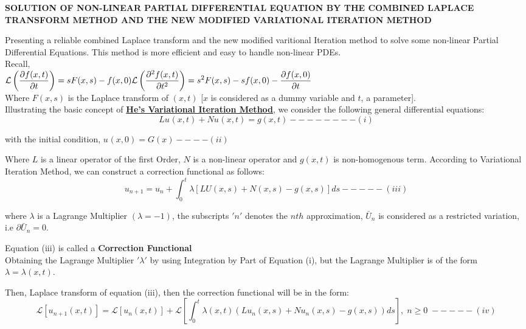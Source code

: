 \documentclass[a4paper 11pt]{article}
\newcommand{\Laplace}{\mathcal{L}}
\newcommand{\Un}[2]{u_{#1}(#2)}
\newcommand{\NI}{\noindent}
\newcommand{\LT}[1]{\Laplace \left[#1\right]}
\newcommand{\LTb}[1]{\Laplace \left(#1\right)}
\begin{document}
\newpage
\begin{center}
\bfseries
SOLUTION OF NON-LINEAR PARTIAL DIFFERENTIAL EQUATION BY THE COMBINED LAPLACE TRANSFORM METHOD AND THE NEW MODIFIED VARIATIONAL ITERATION METHOD
\end{center}

\NI Presenting a reliable combined Laplace transform and the new modified varitional Iteration method to solve some non-linear Partial Differential Equations. This method is more efficient and easy to handle non-linear PDEs.\\

\NI Recall, \\[0.2cm]
$\displaystyle \LTb{\frac{\partial f(x,t)}{\partial t}} = sF(x,s) - f(x,0) \\[0.2cm]
\LTb{\frac{\partial^2 f(x,t)}{\partial t^2}} = s^2 F(x,s) - sf(x,0) - \frac{\partial f(x,0)}{\partial t}
$\\[0.2cm]

\NI Where $F(x,s)$ is the Laplace transform of $(x,t)$ [$x$ is considered as a dummy variable and $t$, a parameter].\\[0.2cm]

\NI Illustrating the basic concept of \underline{\textbf{He's Variational Iteration Method}}, we consider the following general differential equations:\\
$$
L\Un{}{x,t} + N\Un{}{x,t} = g(x,t) - - - - - - - - (i)
$$
\begin{center}
with the initial condition, $\Un{}{x,0} = G(x) - - - - (ii)$
\end{center}

\NI Where $L$ is a linear operator of the first Order, $N$ is a non-linear operator and $g(x,t)$ is non-homogenous term. According to Variational  Iteration Method, we can construct a correction functional as follows: 
$$
u_{n+1} = u_n + \int_{0}^{t} \lambda \left[ LU(x,s) + N(x,s) - g(x,s) \right] ds - - - - - (iii)
$$

\NI where $\lambda$ is a Lagrange Multiplier $(\lambda = -1)$, the subscripts $'n'$ denotes the $nth$ approximation, $\bar{U}_n$ is considered as a restricted variation, i.e $\partial\bar{U}_n = 0$.

\NI Equation (iii) is called a \textbf{Correction Functional}\\
Obtaining the Lagrange Multiplier $'\lambda'$ by using Integration by Part of Equation (i), but the Lagrange Multiplier is of the form $\lambda = \lambda(x,t)$.

\NI Then, Laplace transform of equation (iii), then the correction functional will be in the form:\\[0.25cm]
$$
\LT{\Un{n+1}{x,t}} = \LT{\Un{n}{x,t}} + \LT{\int_{0}^{t}\lambda(x,t)\left( L\Un{n}{x,s} + N\Un{n}{x,s} - g(x,s) \right)ds}, \; n \geq 0 \; - - - - - (iv)
$$
\end{document}
